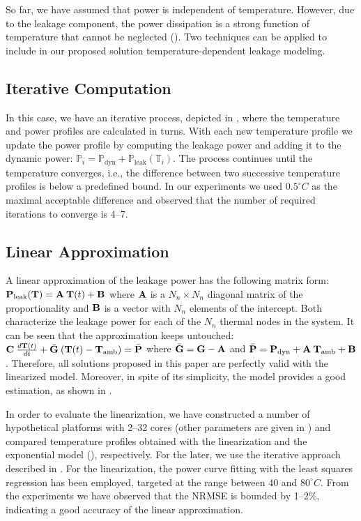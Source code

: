 So far, we have assumed that power is independent of temperature. However, due to the leakage component, the power dissipation is a strong function of temperature that cannot be neglected (). Two techniques can be applied to include in our proposed solution temperature-dependent leakage modeling.

\subsection{Iterative Computation} \label{sec:iterative-leakage}
In this case, we have an iterative process, depicted in , where the temperature and power profiles are calculated in turns. With each new temperature profile we update the power profile by computing the leakage power and adding it to the dynamic power: $\mathbb{P}_i = \mathbb{P}_\text{dyn} + \mathbb{P}_\text{leak}(\mathbb{T}_i)$. The process continues until the temperature converges, i.e., the difference between two successive temperature profiles is below a predefined bound. In our experiments we used $0.5^\circ C$ as the maximal acceptable difference and observed that the number of required iterations to converge is 4--7.




\subsection{Linear Approximation} \label{sec:linearized-leakage}
A linear approximation of the leakage power has the following matrix form: $\mathbf{P}_\text{leak}(\mathbf{T}) = \mathbf{A} \: \mathbf{T}(t) + \mathbf{B}$ where $\mathbf{A}$ is a $N_n \times N_n$ diagonal matrix of the proportionality and $\mathbf{B}$ is a vector with $N_n$ elements of the intercept. Both characterize the leakage power for each of the $N_n$ thermal nodes in the system. It can be seen that the approximation keeps  untouched: $\mathbf{C} \: \frac{d\mathbf{T}(t)}{dt} + \bar{\mathbf{G}} \: (\mathbf{T}(t) - \mathbf{T}_\text{amb}) = \bar{\mathbf{P}}$ where $\bar{\mathbf{G}} = \mathbf{G} - \mathbf{A}$ and $\bar{\mathbf{P}} = \mathbf{P}_\text{dyn} + \mathbf{A} \: \mathbf{T}_\text{amb} + \mathbf{B}$. Therefore, all solutions proposed in this paper are perfectly valid with the linearized model. Moreover, in spite of its simplicity, the model provides a good estimation, as shown in \cite{liu2007}.

In order to evaluate the linearization, we have constructed a number of hypothetical platforms with 2--32 cores (other parameters are given in ) and compared temperature profiles obtained with the linearization and the exponential model (), respectively. For the later, we use the iterative approach described in . For the linearization, the power curve fitting with the least squares regression \cite{press2007} has been employed, targeted at the range between 40 and $80^\circ C$. From the experiments we have observed that the NRMSE is bounded by 1--2\%, indicating a good accuracy of the linear approximation.
